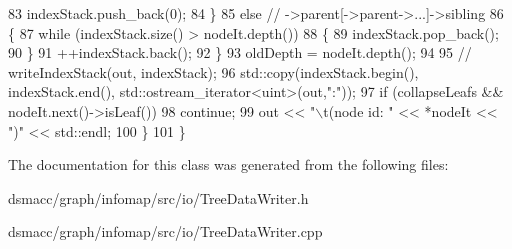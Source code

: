 \begin{DoxyCode}
83             indexStack.push\_back(0);
84         \}
85         \textcolor{keywordflow}{else} \textcolor{comment}{// ->parent[->parent->...]->sibling}
86         \{
87             \textcolor{keywordflow}{while} (indexStack.size() > nodeIt.depth())
88             \{
89                 indexStack.pop\_back();
90             \}
91             ++indexStack.back();
92         \}
93         oldDepth = nodeIt.depth();
94 
95 \textcolor{comment}{//      writeIndexStack(out, indexStack);}
96         std::copy(indexStack.begin(), indexStack.end(), std::ostream\_iterator<uint>(out,\textcolor{stringliteral}{":"}));
97         \textcolor{keywordflow}{if} (collapseLeafs && nodeIt.next()->isLeaf())
98             \textcolor{keywordflow}{continue};
99         out << \textcolor{stringliteral}{"\(\backslash\)t(node id: "} << *nodeIt << \textcolor{stringliteral}{")"} << std::endl;
100     \}
101 \}
\end{DoxyCode}


The documentation for this class was generated from the following files\+:\begin{DoxyCompactItemize}
\item 
dsmacc/graph/infomap/src/io/Tree\+Data\+Writer.\+h\item 
dsmacc/graph/infomap/src/io/Tree\+Data\+Writer.\+cpp\end{DoxyCompactItemize}

